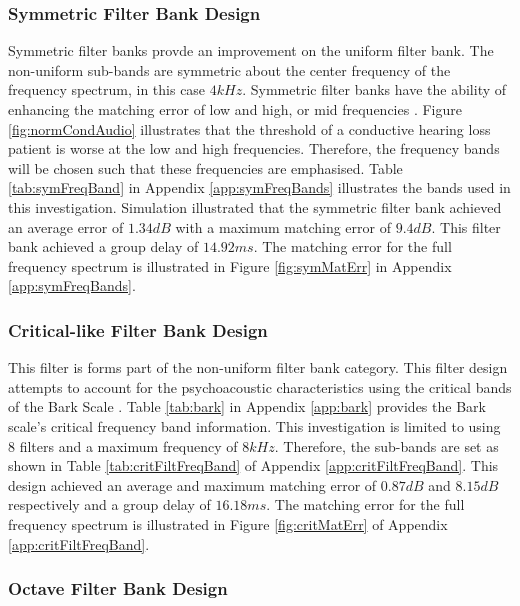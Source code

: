 \documentclass[11pt,onecolumn]{witseiepaper}
\begin{document}
\subsubsection{Symmetric Filter Bank Design}
\label{sec:symmDesign}

\noindent Symmetric filter banks provde an improvement on the uniform filter bank. The non-uniform sub-bands are symmetric about the center frequency of the frequency spectrum, in this case $4kHz$. Symmetric filter banks have the ability of enhancing the matching error of low and high, or mid frequencies \cite{sebastian}. Figure \ref{fig:normCondAudio} illustrates that the threshold of a conductive hearing loss patient is worse at the low and high frequencies. Therefore, the frequency bands will be chosen such that these frequencies are emphasised. Table \ref{tab:symFreqBand} in Appendix \ref{app:symFreqBands} illustrates the bands used in this investigation. Simulation illustrated that the symmetric filter bank achieved an average error of $1.34dB$ with a maximum matching error of $9.4dB$. This filter bank achieved a group delay of $14.92ms$. The matching error for the full frequency spectrum is illustrated in Figure \ref{fig:symMatErr} in Appendix \ref{app:symFreqBands}.


\subsubsection{Critical-like Filter Bank Design}
\label{sec:critDesign}

\noindent This filter is forms part of the non-uniform filter bank category. This filter design attempts to account for the psychoacoustic characteristics using the critical bands of the Bark Scale \cite{chong}. Table \ref{tab:bark} in Appendix \ref{app:bark} provides the Bark scale's critical frequency band information. This investigation is limited to using $8$ filters and a maximum frequency of $8kHz$. Therefore, the sub-bands are set as shown in Table \ref{tab:critFiltFreqBand} of Appendix \ref{app:critFiltFreqBand}.	This design achieved an average and maximum matching error of $0.87dB$ and $8.15dB$ respectively and a group delay of $16.18ms$. The matching error for the full frequency spectrum is illustrated in Figure \ref{fig:critMatErr} of Appendix \ref{app:critFiltFreqBand}.


\subsubsection{Octave Filter Bank Design}
\label{sec:octDesign}
\end{document}
